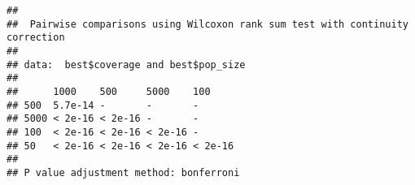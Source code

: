\documentclass[
]{book}
\begin{document}
\begin{verbatim}
## 
##  Pairwise comparisons using Wilcoxon rank sum test with continuity correction 
## 
## data:  best$coverage and best$pop_size 
## 
##      1000    500     5000    100    
## 500  5.7e-14 -       -       -      
## 5000 < 2e-16 < 2e-16 -       -      
## 100  < 2e-16 < 2e-16 < 2e-16 -      
## 50   < 2e-16 < 2e-16 < 2e-16 < 2e-16
## 
## P value adjustment method: bonferroni
\end{verbatim}

  
\end{document}
